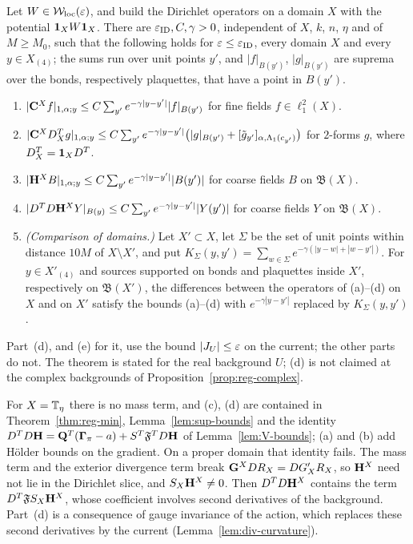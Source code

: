 \begin{theorem}\label{thm:ID}
Let $W\in\mathcal W_{\rm loc}(\varepsilon)$, and build the Dirichlet operators on a domain $X$ with the potential $\mathbf 1_XW\mathbf 1_X$. There are $\varepsilon_{\rm ID},C,\gamma>0$, independent of $X$, $k$, $n$, $\eta$ and of $M\ge M_0$, such that the following holds for $\varepsilon\le\varepsilon_{\rm ID}$, every domain $X$ and every $y\in X_{(4)}$; the sums run over unit points $y'$, and $|f|_{B(y')}$, $|g|_{B(y')}$ are suprema over the bonds, respectively plaquettes, that have a point in $B(y')$.
\begin{enumerate}[label=(\alph*)]
\item $|\mathbf C^Xf|_{1,\alpha;y}\le C\sum_{y'}e^{-\gamma|y-y'|}|f|_{B(y')}$ for fine fields $f\in\ell^2_1(X)$.
\item $|\mathbf C^XD^T_Xg|_{1,\alpha;y}\le C\sum_{y'}e^{-\gamma|y-y'|}\big(|g|_{B(y')}+[\tilde g_{y'}]_{\alpha,\Lambda_1(c_{y'})}\big)$ for $2$-forms $g$, where $D^T_X=\mathbf 1_XD^T$.
\item $|\mathbf H^XB|_{1,\alpha;y}\le C\sum_{y'}e^{-\gamma|y-y'|}|B(y')|$ for coarse fields $B$ on $\mathfrak B(X)$.
\item $|D^TD\mathbf H^XY|_{B(y)}\le C\sum_{y'}e^{-\gamma|y-y'|}|Y(y')|$ for coarse fields $Y$ on $\mathfrak B(X)$.
\item \emph{(Comparison of domains.)} Let $X'\subset X$, let $\Sigma$ be the set of unit points within distance $10M$ of $X\setminus X'$, and put $K_\Sigma(y,y')=\sum_{w\in\Sigma}e^{-\gamma(|y-w|+|w-y'|)}$. For $y\in X'_{(4)}$ and sources supported on bonds and plaquettes inside $X'$, respectively on $\mathfrak B(X')$, the differences between the operators of (a)--(d) on $X$ and on $X'$ satisfy the bounds (a)--(d) with $e^{-\gamma|y-y'|}$ replaced by $K_\Sigma(y,y')$.
\end{enumerate}
Part~(d), and (e) for it, use the bound $|J_U|\le\varepsilon$ on the current; the other parts do not. The theorem is stated for the real background $U$; (d) is not claimed at the complex backgrounds of Proposition~\ref{prop:reg-complex}.
\end{theorem}

For $X=\mathbb T_\eta$ there is no mass term, and (c), (d) are contained in Theorem~\ref{thm:reg-min}, Lemma~\ref{lem:sup-bounds} and the identity $D^TD\mathbf H=\mathbf Q^T(\boldsymbol\Gamma_\pi-a)+S^T\mathfrak F^TD\mathbf H$ of Lemma~\ref{lem:V-bounds}; (a) and (b) add H\"older bounds on the gradient. On a proper domain that identity fails. The mass term and the exterior divergence term break $\mathbf G^XDR_X=DG'_XR_X$, so $\mathbf H^X$ need not lie in the Dirichlet slice, and $S_X\mathbf H^X\ne0$. Then $D^TD\mathbf H^X$ contains the term $D^T\mathfrak FS_X\mathbf H^X$, whose coefficient involves second derivatives of the background. Part~(d) is a consequence of gauge invariance of the action, which replaces these second derivatives by the current (Lemma~\ref{lem:div-curvature}).

